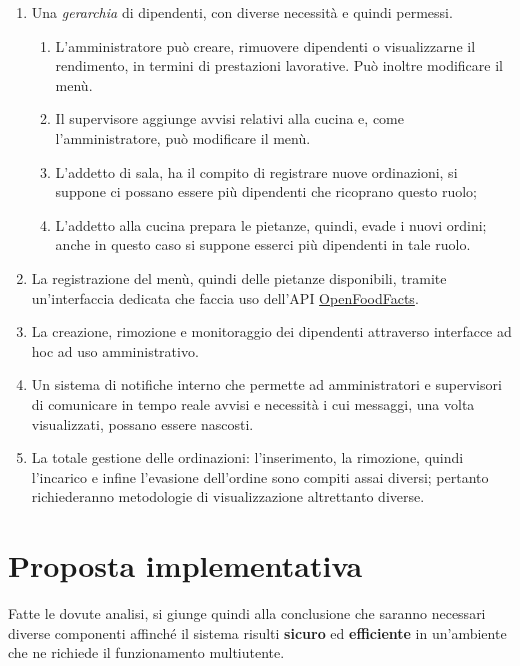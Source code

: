 \begin{enumerate}
	\item Una \textit{gerarchia} di dipendenti, con diverse necessità e quindi permessi.
	\begin{enumerate}
		\item L'amministratore può creare, rimuovere dipendenti o visualizzarne il rendimento, in termini di prestazioni lavorative. Può inoltre modificare il menù.
		\item Il supervisore aggiunge avvisi relativi alla cucina e, come l'amministratore, può modificare il menù.
		\item L'addetto di sala, ha il compito di registrare nuove ordinazioni, si suppone ci possano essere più dipendenti che ricoprano questo ruolo;
		\item L'addetto alla cucina prepara le pietanze, quindi, evade i nuovi ordini; anche in questo caso si suppone esserci più dipendenti in tale ruolo.
	\end{enumerate}

	\item La registrazione del menù, quindi delle pietanze disponibili, tramite un'interfaccia dedicata che faccia uso dell'API \href{https://it.openfoodfacts.org}{OpenFoodFacts}.

	\item La creazione, rimozione e monitoraggio dei dipendenti attraverso interfacce ad hoc ad uso amministrativo.

	\item Un sistema di notifiche interno che permette ad amministratori e supervisori di comunicare in tempo reale avvisi e necessità i cui messaggi, una volta visualizzati, possano essere nascosti.

	\item La totale gestione delle ordinazioni: l'inserimento, la rimozione, quindi l'incarico e infine l'evasione dell'ordine sono compiti assai diversi; pertanto richiederanno metodologie di visualizzazione altrettanto diverse.
\end{enumerate}

\section{Proposta implementativa}
Fatte le dovute analisi, si giunge quindi alla conclusione che saranno necessari diverse componenti affinché il sistema risulti \textbf{sicuro} ed \textbf{efficiente} in un'ambiente che ne richiede il funzionamento multiutente.

